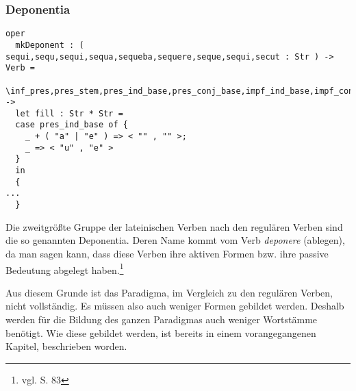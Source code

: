 \subsubsection{Deponentia}
\begin{lstlisting}[float=h!tp,caption={Kopf der Funktion um Deponentia-Formen zu bilden (vgl. \textbf{ResLat.gf})},label={GF-Res-MkDeponent},basicstyle=\small]
oper
  mkDeponent : ( sequi,sequ,sequi,sequa,sequeba,sequere,seque,sequi,secut : Str ) -> Verb =
    \inf_pres,pres_stem,pres_ind_base,pres_conj_base,impf_ind_base,impf_conj_base,fut_I_base,imp_base,part_stem -> 
  let fill : Str * Str =
  case pres_ind_base of {
    _ + ( "a" | "e" ) => < "" , "" >;
    _ => < "u" , "e" > 
  }
  in
  {
...
  }
\end{lstlisting}
Die zweitgrößte Gruppe der lateinischen Verben nach den regulären Verben sind die so genannten Deponentia. Deren Name kommt vom Verb \textit{deponere} (ablegen), da man sagen kann, dass diese Verben ihre aktiven Formen bzw. ihre passive Bedeutung abgelegt haben.\footnote{vgl. \cite{BAYER-LINDAUER1994} S. 83} \par
Aus diesem Grunde ist das Paradigma, im Vergleich zu den regulären Verben, nicht vollständig. Es müssen also auch weniger Formen gebildet werden. Deshalb werden für die Bildung des ganzen Paradigmas auch weniger Wortstämme benötigt. Wie diese gebildet werden, ist bereits in einem vorangegangenen Kapitel, beschrieben worden. \par

